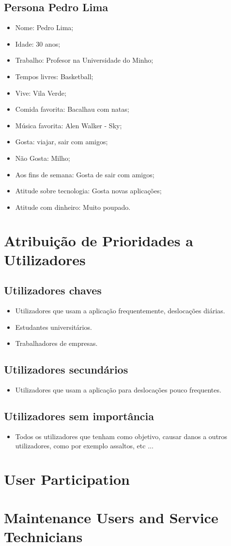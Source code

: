 \subsection{Persona Pedro Lima}

\begin{itemize}
    \item Nome: Pedro Lima;
    \item Idade: 30 anos;
    \item Trabalho: Profesor na Universidade do Minho;
    \item Tempos livres: Basketball;
    \item Vive: Vila Verde;
    \item Comida favorita: Bacalhau com natas;
    \item Música favorita: Alen Walker - Sky;
    \item Gosta: viajar, sair com amigos;
    \item Não Gosta: Milho;
    \item Aos fins de semana: Gosta de sair com amigos;
    \item Atitude sobre tecnologia: Gosta novas aplicações;
    \item Atitude com dinheiro: Muito poupado.
\end{itemize}{}

\section{Atribuição de Prioridades a Utilizadores}

\subsection{Utilizadores chaves}
\begin{itemize}
    \item Utilizadores que usam a aplicação frequentemente, deslocações diárias.
    \item Estudantes universitários.
    \item Trabalhadores de empresas.
\end{itemize}{}
\subsection{Utilizadores secundários}
\begin{itemize}
    \item Utilizadores que usam a aplicação para deslocações pouco frequentes.
\end{itemize}{}
\subsection{Utilizadores sem importância}
\begin{itemize}
    \item Todos os utilizadores que tenham como objetivo, causar danos a outros utilizadores, como por exemplo assaltos, etc ...
\end{itemize}{}

\section{User Participation}

\section{Maintenance Users and Service Technicians}
